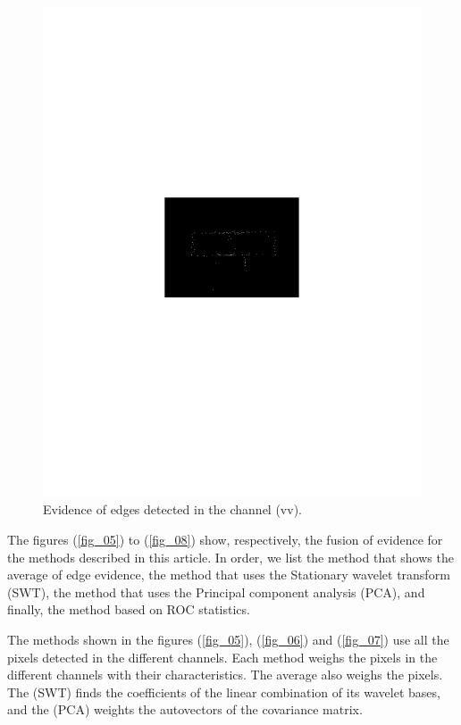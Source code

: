\documentclass[conference]{IEEEtran}
\begin{document}
{{{{\begin{figure}[hbt]
	\includegraphics[scale=0.75]{flevoland_vv_evid_crop.pdf}
	\vspace{-6.0cm}
	\caption{Evidence of edges detected in the channel (vv).}
\label{fig_04}
\end{figure}
The figures (\ref{fig_05}) to (\ref{fig_08}) show, respectively, the fusion of evidence for the methods described in this article. In order, we list the method that shows the average of edge evidence, the method that uses the Stationary wavelet transform (SWT), the method that uses the Principal component analysis (PCA), and finally, the method based on ROC statistics.

The methods shown in the figures (\ref{fig_05}), (\ref{fig_06}) and (\ref{fig_07}) use all the pixels detected in the different channels. Each method weighs the pixels in the different channels with their characteristics. The average also weighs the pixels. The (SWT) finds the coefficients of the linear combination of its wavelet bases, and the (PCA) weights the autovectors of the covariance matrix.

}}}}
\end{document}
